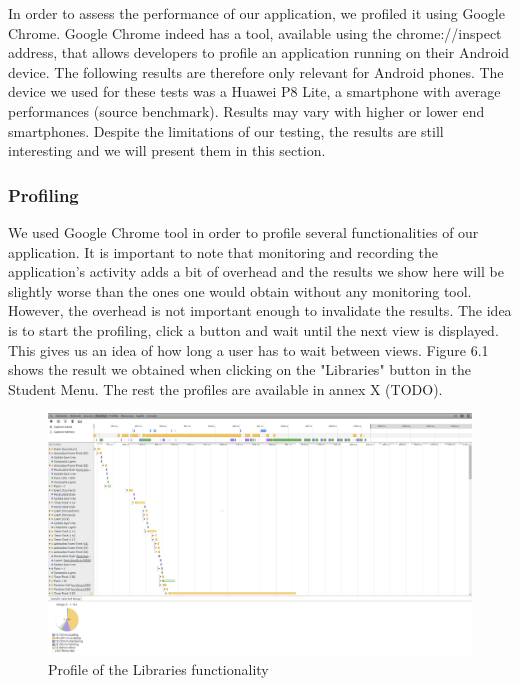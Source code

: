 \documentclass{eplmastersthesis}
\begin{document}
In order to assess the performance of our application, we profiled it using Google Chrome. Google Chrome indeed has a tool, available using the chrome://inspect address, that allows developers to profile an application running on their Android device. The following results are therefore only relevant for Android phones. The device we used for these tests was a Huawei P8 Lite, a smartphone with average performances (source benchmark). Results may vary with higher or lower end smartphones. Despite the limitations of our testing, the results are still interesting and we will present them in this section.
\subsubsection{Profiling}
We used Google Chrome tool in order to profile several functionalities of our application. It is important to note that monitoring and recording the application's activity adds a bit of overhead and the results we show here will be slightly worse than the ones one would obtain without any monitoring tool. However, the overhead is not important enough to invalidate the results. The idea is to start the profiling, click a button and wait until the next view is displayed. This gives us an idea of how long a user has to wait between views. Figure 6.1 shows the result we obtained when clicking on the "Libraries" button in the Student Menu. The rest the profiles are available in annex X (TODO).\\

\begin{figure}
\centering
\includegraphics[scale = 0.25]{Images/libraries.png}
\caption{Profile of the Libraries functionality}
\end{figure}
\end{document}
